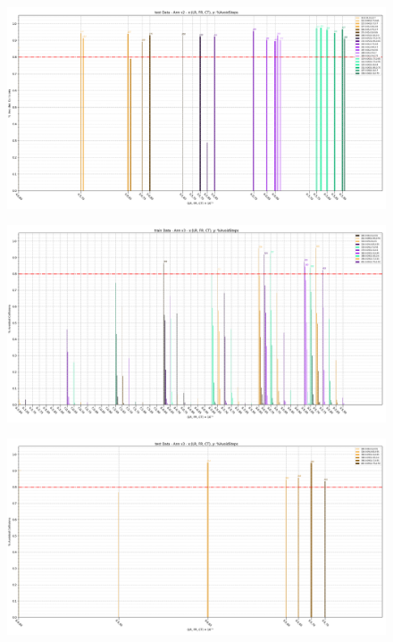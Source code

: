 \begin{figure}[H]
    \centering
    \includegraphics[scale=0.55,rotate=-90]{figures/test_annv2_2d.png}
    \caption{}
    \label{fig:TestV2}
\end{figure}

\newpage
\thispagestyle{empty}

\begin{figure}[H]
    \centering
    \includegraphics[scale=0.55,rotate=-90]{figures/train_annv3_2d.png}
    \caption{}
    \label{fig:TrainV3}
\end{figure}

\newpage
\thispagestyle{empty}

\begin{figure}[H]
    \centering
    \includegraphics[scale=0.55,rotate=-90]{figures/test_annv3_2d.png}
    \caption{}
    \label{fig:TestV3}
\end{figure}

